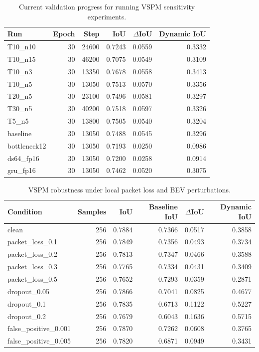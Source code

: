 \begin{table}[t]
\centering
\caption{Current validation progress for running VSPM sensitivity experiments.}
\label{tab:vspm-progress}
\begin{tabular}{lrrrrr}
\toprule
Run & Epoch & Step & IoU & $\Delta$IoU & Dynamic IoU \\
\midrule
T10\_n10 & 30 & 24600 & 0.7243 & 0.0559 & 0.3332 \\
T10\_n15 & 30 & 46200 & 0.7075 & 0.0549 & 0.3109 \\
T10\_n3 & 30 & 13350 & 0.7678 & 0.0558 & 0.3413 \\
T10\_n5 & 30 & 13050 & 0.7513 & 0.0570 & 0.3356 \\
T20\_n5 & 30 & 23100 & 0.7496 & 0.0581 & 0.3297 \\
T30\_n5 & 30 & 40200 & 0.7518 & 0.0597 & 0.3326 \\
T5\_n5 & 30 & 13800 & 0.7505 & 0.0540 & 0.3204 \\
baseline & 30 & 13050 & 0.7488 & 0.0545 & 0.3296 \\
bottleneck12 & 30 & 13050 & 0.7193 & 0.0250 & 0.0986 \\
ds64\_fp16 & 30 & 13050 & 0.7200 & 0.0258 & 0.0914 \\
gru\_fp16 & 30 & 13050 & 0.7462 & 0.0520 & 0.3075 \\
\bottomrule
\end{tabular}
\end{table}

\begin{table}[t]
\centering
\caption{VSPM robustness under local packet loss and BEV perturbations.}
\label{tab:vspm-robustness}
\begin{tabular}{lrrrrr}
\toprule
Condition & Samples & IoU & Baseline IoU & $\Delta$IoU & Dynamic IoU \\
\midrule
clean & 256 & 0.7884 & 0.7366 & 0.0517 & 0.3858 \\
packet\_loss\_0.1 & 256 & 0.7849 & 0.7356 & 0.0493 & 0.3734 \\
packet\_loss\_0.2 & 256 & 0.7813 & 0.7347 & 0.0466 & 0.3588 \\
packet\_loss\_0.3 & 256 & 0.7765 & 0.7334 & 0.0431 & 0.3409 \\
packet\_loss\_0.5 & 256 & 0.7652 & 0.7293 & 0.0359 & 0.2871 \\
dropout\_0.05 & 256 & 0.7866 & 0.7041 & 0.0825 & 0.4677 \\
dropout\_0.1 & 256 & 0.7835 & 0.6713 & 0.1122 & 0.5227 \\
dropout\_0.2 & 256 & 0.7679 & 0.6043 & 0.1636 & 0.5715 \\
false\_positive\_0.001 & 256 & 0.7870 & 0.7262 & 0.0608 & 0.3765 \\
false\_positive\_0.005 & 256 & 0.7820 & 0.6871 & 0.0949 & 0.3431 \\
\bottomrule
\end{tabular}
\end{table}

